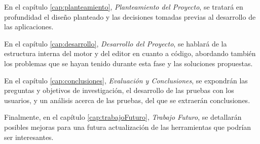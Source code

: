 \medskip

En el capítulo \ref{cap:planteamiento}, \textit{Planteamiento del Proyecto}, se tratará en profundidad el diseño planteado y las decisiones tomadas previas al desarrollo de las aplicaciones.

\medskip

En el capítulo \ref{cap:desarrollo}, \textit{Desarrollo del Proyecto}, se hablará de la estructura interna del motor y del editor en cuanto a código, abordando también los problemas que se hayan tenido durante esta fase y las soluciones propuestas.

\medskip

En el capítulo \ref{cap:conclusiones}, \textit{Evaluación y Conclusiones}, se expondrán las preguntas y objetivos de investigación, el desarrollo de las pruebas con los usuarios, y un análisis acerca de las pruebas, del que se extraerán conclusiones.

\medskip

Finalmente, en el capítulo \ref{cap:trabajoFuturo}, \textit{Trabajo Futuro}, se detallarán posibles mejoras para una futura actualización de las herramientas que podrían ser interesantes.